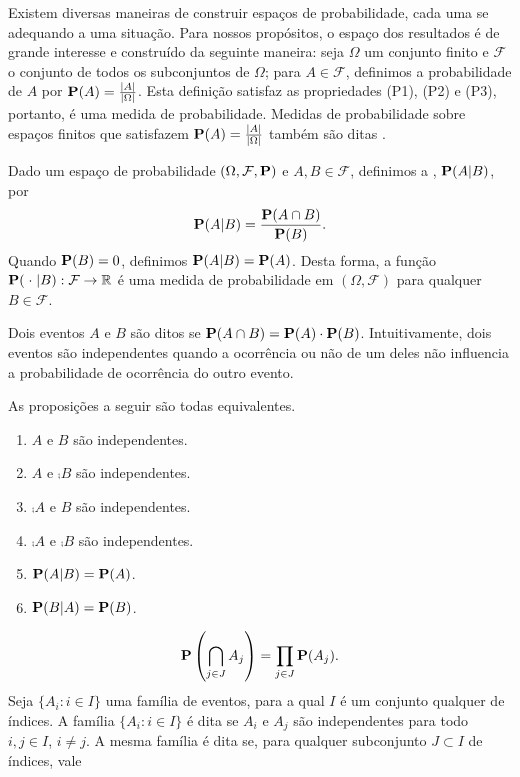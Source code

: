Existem diversas maneiras de construir espaços de probabilidade, cada uma se adequando a uma situação. Para nossos propósitos, o espaço dos resultados  é de grande interesse e construído da seguinte maneira:
seja $\Omega$ um conjunto finito e $\mathcal{F}$ o conjunto de todos os subconjuntos de $\Omega$; para $A \in \mathcal{F}$, definimos a probabilidade de $A$ por $\operatorname{\mathbf{P}}(A) = \frac{\left | A \right |}{\left | \Omega \right |}$. Esta definição satisfaz as propriedades (P1), (P2) e (P3), portanto, é uma medida de probabilidade. Medidas de probabilidade sobre espaços finitos que satisfazem $\operatorname{\mathbf{P}}(A) = \frac{\left | A \right |}{\left | \Omega \right |}$ também são ditas .

Dado um espaço de probabilidade $(\Omega, \mathcal{F}, \operatorname{\mathbf{P}})$ e $A, B \in \mathcal{F}$, definimos a , $\operatorname{\mathbf{P}}(A | B)$, por
\[ \operatorname{\mathbf{P}}(A|B) = \frac{\operatorname{\mathbf{P}}(A \cap B)}{\operatorname{\mathbf{P}}(B)}. \]
Quando $\operatorname{\mathbf{P}}(B) = 0$, definimos $\operatorname{\mathbf{P}}(A|B) = \operatorname{\mathbf{P}}(A)$. Desta forma, a função $\operatorname{\mathbf{P}}(\; \cdot \;| B) : \mathcal{F} \to \mathbb{R}$ é uma medida de probabilidade em $(\Omega, \mathcal{F})$ para qualquer $B \in \mathcal{F}$.

Dois eventos $A$ e $B$ são ditos  se $\operatorname{\mathbf{P}}(A \cap B) = \operatorname{\mathbf{P}}(A) \cdot \operatorname{\mathbf{P}}(B)$. Intuitivamente, dois eventos são independentes quando a ocorrência ou não de um deles não influencia a probabilidade de ocorrência do outro evento.

As proposições a seguir são todas equivalentes.
\begin{enumerate}[label=\arabic*.,itemindent=*]
  \item $A$ e $B$ são independentes.
  \item $A$ e $\comp{B}$ são independentes.
  \item $\comp{A}$ e $B$ são independentes.
  \item $\comp{A}$ e $\comp{B}$ são independentes.
  \item $\operatorname{\mathbf{P}}(A|B) = \operatorname{\mathbf{P}}(A)$.
  \item $\operatorname{\mathbf{P}}(B|A) = \operatorname{\mathbf{P}}(B)$.
\end{enumerate}

\[ \operatorname{\mathbf{P}}\left(\bigcap_{j \in J} A_j \right) = \prod_{j \in J}\operatorname{\mathbf{P}}(A_j).\]
Seja $\{ A_i : i \in I\}$ uma família de eventos, para a qual $I$ é um conjunto qualquer de índices. A família $\{ A_i : i \in I\}$ é dita  se $A_i$ e $A_j$ são independentes para todo $i,j \in I$, $i \neq j$. A mesma família é dita  se, para qualquer subconjunto $J \subset I$ de índices, vale


